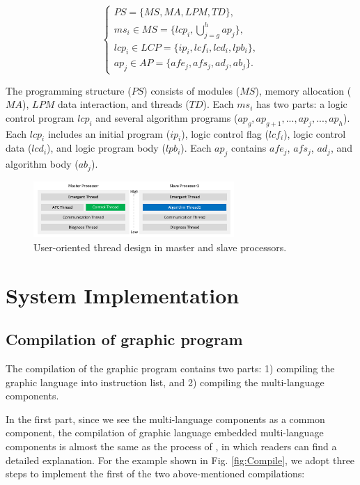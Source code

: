 \documentclass[journal,UTF8]{IEEEtran}
\begin{document}
	\begin{equation}
	\left\{
	\begin{array}{l}
	PS = \{MS, MA , LPM, TD\},\\
	ms_i \in MS = \{lcp_i, \bigcup_{j=g}^h ap_j\},\\
	lcp_i \in LCP = \{ip_i, lcf_i, lcd_i, lpb_i\},\\
	ap_j \in AP = \{afe_j, afs_j, ad_j, ab_j\}.
	\end{array}
	\right.
	\end{equation}
	
	The programming structure ($PS$) consists of modules ($MS$), memory allocation ($MA$), $LPM$ data interaction, and threads ($TD$). Each $ms_i$ has two parts: a logic control program $lcp_i$ and several algorithm programs ($ap_g, ap_{g+1},..., ap_{j},..., ap_{h}$). Each $lcp_i$ includes an initial program ($ip_i$), logic control flag ($lcf_i$), logic control data ($lcd_i$), and logic program body ($lpb_i$). Each $ap_{j}$ contains $afe_{j}$, $afs_{j}$, $ad_{j}$, and algorithm body ($ab_{j}$).
	
	\begin{figure}
		\centering
		\includegraphics[width=3in]{fig/FIG5.pdf}
		\caption{ User-oriented thread design in master and slave processors.}
		\label{fig:Threads}
	\end{figure}
	\section{System Implementation}
	\label{Process}
	\subsection{Compilation of graphic program}
	The compilation of the graphic program contains two parts: 1) compiling the graphic language into instruction list, and 2) compiling the multi-language components.
	
	In the first part, since we see the multi-language components as a common component, the compilation of graphic language embedded multi-language components is almost the same as the process of \cite{Yan2010Compiling}, in which readers can find a detailed explanation. For the example shown in Fig. \ref{fig:Compile}, we adopt three steps to implement the first of the two above-mentioned compilations:
	
\end{document}
